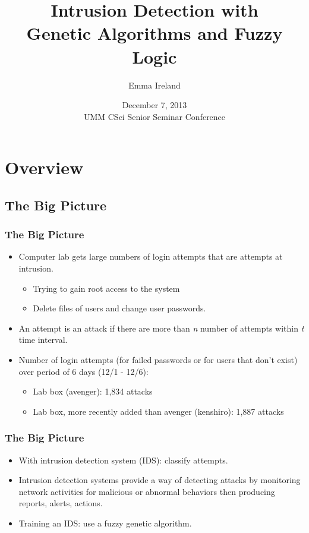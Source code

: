 \documentclass{beamer}
\title[Intrusion Detection]{Intrusion Detection with \\ Genetic Algorithms and Fuzzy Logic}
\author[Ireland]{Emma Ireland}
\institute[U of Minn, Morris]
{
  Division of Science and Mathematics \\
  University of Minnesota, Morris \\
  Morris, Minnesota, USA
}
\date[December 7, 2013] %
{December 7, 2013 \\ UMM CSci Senior Seminar Conference}
\newcommand{\linespace}{\vskip 0.25cm}
\begin{document}
\begin{frame}
  \titlepage
\end{frame}


\section*{Overview}

\subsection*{The Big Picture}

\begin{frame}
  \frametitle{The Big Picture}
  \begin{itemize}
  	\item Computer lab gets large numbers of login attempts that are attempts at intrusion.
	\begin{itemize}
		\item Trying to gain root access to the system
		\item Delete files of users and change user passwords.
	\end{itemize}
	\linespace
	\linespace
	\linespace

	\item An attempt is an attack if there are more than \emph{n} number of attempts within \emph{t} time interval.
	\item Number of login attempts (for failed passwords or for users that don't exist) over period of 6 days (12/1 - 12/6):
	\begin{itemize}
		\item Lab box (avenger): 1,834 attacks
		\item Lab box, more recently added than avenger (kenshiro): 1,887 attacks
	\end{itemize}
  \end{itemize}
\end{frame}


\begin{frame}
  \frametitle{The Big Picture}
  \begin{itemize}
	\item With intrusion detection system (IDS): classify attempts.
	\item Intrusion detection systems provide a way of detecting attacks by monitoring network activities for malicious or abnormal behaviors then producing reports, alerts, actions.
	\item Training an IDS: use a fuzzy genetic algorithm.
  \end{itemize}
\end{frame}
\end{document}
